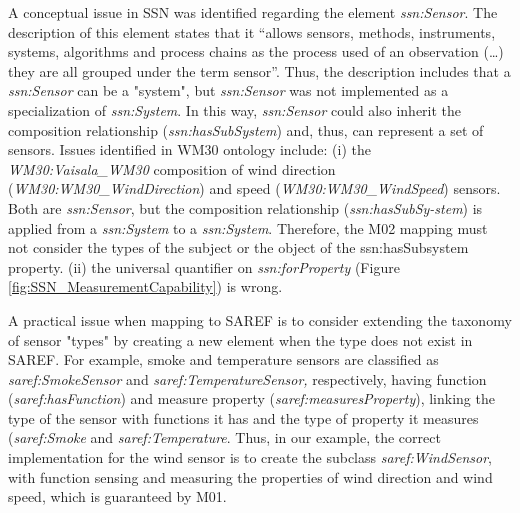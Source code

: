 \documentclass{sig-alternate-05-2015}
\begin{document}
A conceptual issue in SSN was identified regarding the element \textit{ssn:\-Sensor}. The description of this element states that it “allows sensors, methods, instruments, systems, algorithms and process chains as the process used of an observation (…) they are all grouped under the term sensor”. Thus, the description includes that a \textit{ssn:\-Sensor} can be a "system", but \textit{ssn:\-Sensor} was not implemented as a specialization of \textit{ssn:\-System}. In this way, \textit{ssn:\-Sensor} could also inherit the composition relationship (\textit{ssn:\-hasSubSystem}) and, thus, can represent a set of sensors. Issues identified in WM30 ontology include: (i) the \textit{WM30:\-Vaisala\-\_WM30} composition of wind direction (\textit{WM30:\-WM30\-\_Wind\-Direction}) and speed (\textit{WM30:\-WM30\-\_WindSpeed}) sensors. Both are \textit{ssn:\-Sensor}, but the composition relationship (\textit{ssn:\-hasSubSy-stem}) is applied from a \textit{ssn:\-System} to a \textit{ssn:\-System}. Therefore, the M02 mapping must not consider the types of the subject or the object of the ssn:hasSubsystem property. (ii) the universal quantifier on \textit{ssn:forProperty} (Figure \ref{fig:SSN_MeasurementCapability}) is wrong.

A practical issue when mapping to SAREF is to consider extending the taxonomy of sensor "types" by creating a new element when the type does not exist in SAREF. For example, smoke and temperature sensors are classified as \textit{saref:\-SmokeSensor} and \textit{saref:\-TemperatureSensor,} respectively, having  function (\textit{saref:\-hasFunction}) and measure property (\textit{saref:\-measuresProperty}), linking the type of the sensor with functions it has and the type of property it measures (\textit{saref:\-Smoke} and \textit{saref:\-Temperature}. Thus, in our example, the correct implementation for the wind sensor is to create the subclass \textit{saref:\-WindSensor}, with function sensing and measuring the properties of wind direction and wind speed, which is guaranteed by M01. 
\end{document}
